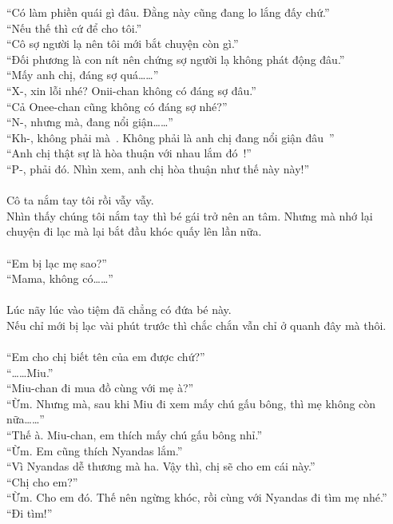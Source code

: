 \documentclass[12pt,a4paper, twosides]{book}
\begin{document}
“Có làm phiền quái gì đâu. Đằng này cũng đang lo lắng đấy chứ.”\\
“Nếu thế thì cứ để cho tôi.”\\
“Cô sợ người lạ nên tôi mới bắt chuyện còn gì.”\\
“Đối phương là con nít nên chứng sợ người lạ không phát động đâu.”\\
“Mấy anh chị, đáng sợ quá……”\\
“X-, xin lỗi nhé? Onii-chan không có đáng sợ đâu.”\\
“Cả Onee-chan cũng không có đáng sợ nhé?”\\
“N-, nhưng mà, đang nổi giận……”\\
“Kh-, không phải mà~. Không phải là anh chị đang nổi giận đâu~”\\
“Anh chị thật sự là hòa thuận với nhau lắm đó~!”\\
“P-, phải đó. Nhìn xem, anh chị hòa thuận như thế này này!”\\
\\
Cô ta nắm tay tôi rồi vẫy vẫy.\\
Nhìn thấy chúng tôi nắm tay thì bé gái trở nên an tâm. Nhưng mà nhớ lại chuyện đi lạc mà lại bắt đầu khóc quấy lên lần nữa.\\
\\
“Em bị lạc mẹ sao?”\\
“Mama, không có……”\\
\\
Lúc nãy lúc vào tiệm đã chẳng có đứa bé này.\\
Nếu chỉ mới bị lạc vài phút trước thì chắc chắn vẫn chỉ ở quanh đây mà thôi.\\
\\
“Em cho chị biết tên của em được chứ?”\\
“……Miu.”\\
“Miu-chan đi mua đồ cùng với mẹ à?”\\
“Ừm. Nhưng mà, sau khi Miu đi xem mấy chú gấu bông, thì mẹ không còn nữa……”\\
“Thế à. Miu-chan, em thích mấy chú gấu bông nhỉ.”\\
“Ừm. Em cũng thích Nyandas lắm.”\\
“Vì Nyandas dễ thương mà ha. Vậy thì, chị sẽ cho em cái này.”\\
“Chị cho em?”\\
“Ừm. Cho em đó. Thế nên ngừng khóc, rồi cùng với Nyandas đi tìm mẹ nhé.”\\
“Đi tìm!”\\
\\
\end{document}
